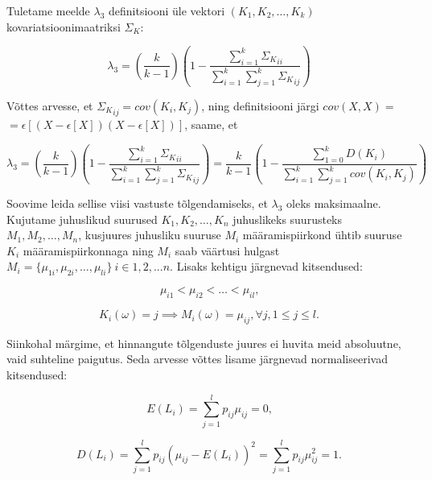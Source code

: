 \documentclass[a4paper,12pt,oneside]{article}
\numberwithin{equation}{section}
\theoremstyle{definition}
\begin{document}
Tuletame meelde $\lambda_3$ definitsiooni üle vektori $\left( K_1, K_2, \ldots,K_k \right)$ kovariatsioonimaatriksi $\Sigma_K$: 

\begin{equation*}
\lambda_3 = (\frac{k}{k-1})( 1 - \frac{\sum \limits_{i=1}^k {\Sigma_K}_{ii} }{ \sum \limits_{i=1}^k \sum \limits_{j=1}^k {\Sigma_K}_{ij}})
\end{equation*}

Võttes arvesse, et ${\Sigma_K}_{ij} = cov(K_i,K_j)$, ning definitsiooni järgi $cov(X,X) = $ $= \epsilon \left[ (X - \epsilon \left[X \right]) (X - \epsilon \left[X \right]) \right]$, saame, et 

 
\begin{equation*}
\lambda_3 = (\frac{k}{k-1})( 1 - \frac{\sum \limits_{i=1}^k {\Sigma_K}_{ii} }{ \sum \limits_{i=1}^k \sum \limits_{j=1}^k {\Sigma_K}_{ij}})= \frac{k}{k-1}\left(1 - \frac
{\sum \limits_{1=0}^k D(K_i)}{\sum \limits_{i=1}^k \sum \limits_{j=1}^k cov(K_i,K_j)}\right)
\end{equation*}

Soovime leida sellise viisi vastuste tõlgendamiseks, et $\lambda_3$ oleks maksimaalne. Kujutame juhuslikud suurused $K_1,K_2,\ldots,K_n$ juhuslikeks suurusteks $M_1, M_2,\ldots,M_n$, kusjuures juhusliku suuruse $M_i$ määramispiirkond ühtib suuruse $K_i$ määramis\-piirkonnaga ning $M_i$ saab väärtusi hulgast $M_i = \lbrace \mu_{1i},\mu_{2i},\ldots,\mu_{li} \rbrace ~ i \in {1,2,...n}$. Lisaks kehtigu järgnevad kitsendused: 

\begin{equation*}
\mu_{i1} < \mu_{i2}  < \ldots  < \mu_{il} \text{,}
\end{equation*}


\begin{equation*}
K_i(\omega) = j \implies M_i(\omega) = \mu_{ij} , \forall j ,  1 \leq j \leq l \text{.}
\end{equation*}

Siinkohal märgime, et hinnangute tõlgenduste juures ei huvita meid absoluutne, vaid suhteline paigutus. Seda arvesse võttes lisame järgnevad normaliseerivad kitsendused:


\begin{equation}
\label{eq:e_is_0}
E(L_i) = \sum \limits_{j=1}^l p_{ij} \mu_{ij}=0 \text{,}
\end{equation}

\begin{equation}
D(L_i) = \sum \limits_{j=1}^l p_{ij} (\mu_{ij} - E(L_i))^2 = \sum \limits_{j=1}^l p_{ij} \mu_{ij}^2 =  1  \text{.}
\end{equation}
\end{document}
